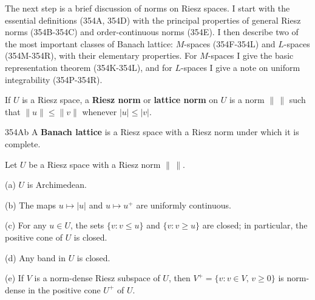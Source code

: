 
\def\chaptername{Riesz Spaces}
\def\sectionname{Banach lattices}


The next step is a brief discussion of norms on Riesz spaces.   I start
with the essential definitions (354A, 354D) with the principal
properties of
general Riesz norms (354B-354C) and order-continuous norms (354E).   I
then describe two of the most important classes of Banach lattice:
$M$-spaces (354F-354L) %
and $L$-spaces (354M-354R), %
with their elementary
properties.   For $M$-spaces I give the basic representation theorem
(354K-354L), and for $L$-spaces I give a note on uniform integrability
(354P-354R).  %

 If $U$ is a Riesz space, a {\bf Riesz
norm} or {\bf lattice norm}
on $U$ is a norm $\|\,\|$ such that $\|u\|\le\|v\|$ whenever
$|u|\le|v|$.

\spheader 354Ab A {\bf Banach lattice} is a Riesz space with a Riesz
norm under which it is complete.


 Let $U$ be a Riesz space with a Riesz norm
$\|\,\|$.

(a) $U$ is Archimedean.

(b) The maps $u\mapsto|u|$ and $u\mapsto u^+$ are uniformly continuous.

(c) For any $u\in U$, the sets $\{v:v\le u\}$ and $\{v:v\ge u\}$ are
closed;  in particular, the positive cone of $U$ is closed.

(d) Any band in $U$ is closed.

(e) If $V$ is a norm-dense Riesz subspace of $U$, then $V^+=\{v:v\in
V,\,v\ge 0\}$ is norm-dense in the positive cone $U^+$ of $U$.

